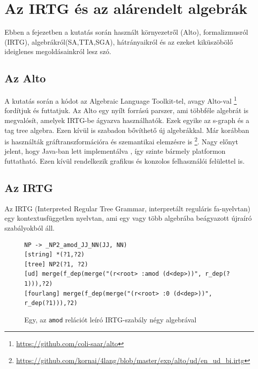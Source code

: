 \section{Az IRTG és az alárendelt algebrák}
\label{sec:aists}
Ebben a fejezetben a kutatás során használt környezetről (Alto), formalizmusról (IRTG), algebrákról(SA,TTA,SGA), hátrányaikról és az ezeket kiküszöbölő ideiglenes megoldásainkról lesz szó.


\subsection{Az Alto}
\label{sec:alto}
A kutatás során a kódot az Algebraic Language Toolkit-tel, avagy Alto-val \footnote{\url{https://github.com/coli-saar/alto}} fordítjuk és futtatjuk. Az Alto egy nyílt forrású parszer, ami többféle algebrát is megvalósít, amelyek IRTG-be ágyazva használhatók.
Ezek egyike az s-graph és a tag tree algebra. Ezen kívül is szabadon bővíthető új algebrákkal. Már korábban is használták gráftranszformációra és szemantikai elemzésre is \footnote{\url{https://github.com/kornai/4lang/blob/master/exp/alto/ud/en_ud_bi.irtg}}. Nagy előnyt jelent, hogy Java-ban lett implementálva , így szinte bármely platformon futtatható. Ezen kívül rendelkezik grafikus és konzolos felhasználói felülettel is.


\subsection{Az IRTG}
\label{sec:irtg}
Az IRTG (Interpreted Regular Tree Grammar, interpretált reguláris fa-nyelvtan) \cite{Koller:2011} egy kontextusfüggetlen nyelvtan, ami egy vagy több algebrába beágyazott újraíró szabályokból áll.

\begin{figure}[h]
\begin{verbatim}
NP -> _NP2_amod_JJ_NN(JJ, NN)
[string] *(?1,?2)
[tree] NP2(?1, ?2)
[ud] merge(f_dep(merge("(r<root> :amod (d<dep>))", r_dep(?1))),?2)
[fourlang] merge(f_dep(merge("(r<root> :0 (d<dep>))", r_dep(?1))),?2)
\end{verbatim}
\caption{Egy, az \texttt{amod} relációt leíró IRTG-szabály négy algebrával}
\label{fig:amod_irtg}
\end{figure}

